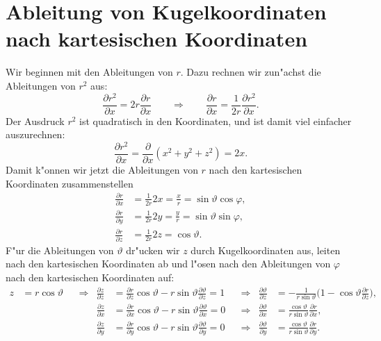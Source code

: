 \section{Ableitung von Kugelkoordinaten nach kartesischen Koordinaten}
Wir beginnen mit den Ableitungen von $r$. Dazu rechnen wir zun"achst die
Ableitungen von $r^2$ aus:
\[
\frac{\partial r^2}{\partial x}
=
2r\frac{\partial r}{\partial x}
\qquad
\Rightarrow
\qquad
\frac{\partial r}{\partial x}
=
\frac1{2r}\frac{\partial r^2}{\partial x}.
\]
Der Ausdruck  $r^2$ ist quadratisch in den Koordinaten, und ist damit
viel einfacher auszurechnen:
\[
\frac{\partial r^2}{\partial x}=\frac{\partial}{\partial x}(x^2+y^2+z^2)=2x.
\]
Damit k"onnen wir jetzt die Ableitungen von $r$ nach den kartesischen
Koordinaten zusammenstellen
\begin{equation}
\begin{aligned}
\frac{\partial r}{\partial x}
&=
\frac1{2r}2x=\frac{x}{r}=\sin\vartheta\cos\varphi,
\\
\frac{\partial r}{\partial y}
&=
\frac1{2r}2y=\frac{y}{r}=\sin\vartheta\sin\varphi,
\\
\frac{\partial r}{\partial z}
&=
\frac1{2r}2z=\cos\vartheta.
\end{aligned}
\label{skript:ableitungenvonr}
\end{equation}
F"ur die Ableitungen von $\vartheta$ dr"ucken wir $z$ durch Kugelkoordinaten
aus, leiten nach den kartesischen Koordinaten ab und l"osen nach den
Ableitungen von $\varphi$ nach den kartesischen Koordinaten auf:
\begin{align*}
z&=r\cos\vartheta
&&\Rightarrow&
\frac{\partial z}{\partial z}
&=
\frac{\partial r}{\partial z}\cos\vartheta
-
r \sin\vartheta\frac{\partial \vartheta}{\partial z}
=1
&&\Rightarrow&
\frac{\partial\vartheta}{\partial z}
&=
-\frac1{r\sin\vartheta}
\biggl(1-\cos\vartheta\frac{\partial r}{\partial z}\biggr),
\\
&&&&
\frac{\partial z}{\partial x}
&=
\frac{\partial r}{\partial x}\cos\vartheta
	- r\sin\vartheta\frac{\partial\vartheta}{\partial x}
=0
&&\Rightarrow&
\frac{\partial\vartheta}{\partial x}
&=
\frac{\cos\vartheta}{r\sin\vartheta}\frac{\partial r}{\partial x},
\\
&&&&
\frac{\partial z}{\partial y}
&=
\frac{\partial r}{\partial y}\cos\vartheta
	- r\sin\vartheta\frac{\partial\vartheta}{\partial y}
=0
&&\Rightarrow&
\frac{\partial\vartheta}{\partial y}
&=
\frac{\cos\vartheta}{r\sin\vartheta}\frac{\partial r}{\partial y}.
\end{align*}

